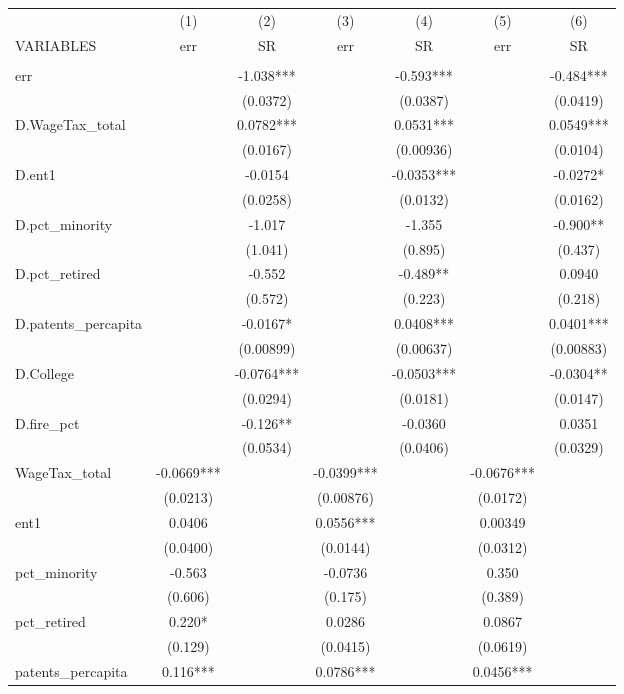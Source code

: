 \begin{tabular}{lcccccc} \hline
 & (1) & (2) & (3) & (4) & (5) & (6) \\
VARIABLES & err & SR & err & SR & err & SR \\ \hline
 &  &  &  &  &  &  \\
err &  & -1.038*** &  & -0.593*** &  & -0.484*** \\
 &  & (0.0372) &  & (0.0387) &  & (0.0419) \\
D.WageTax\_total &  & 0.0782*** &  & 0.0531*** &  & 0.0549*** \\
 &  & (0.0167) &  & (0.00936) &  & (0.0104) \\
D.ent1 &  & -0.0154 &  & -0.0353*** &  & -0.0272* \\
 &  & (0.0258) &  & (0.0132) &  & (0.0162) \\
D.pct\_minority &  & -1.017 &  & -1.355 &  & -0.900** \\
 &  & (1.041) &  & (0.895) &  & (0.437) \\
D.pct\_retired &  & -0.552 &  & -0.489** &  & 0.0940 \\
 &  & (0.572) &  & (0.223) &  & (0.218) \\
D.patents\_percapita &  & -0.0167* &  & 0.0408*** &  & 0.0401*** \\
 &  & (0.00899) &  & (0.00637) &  & (0.00883) \\
D.College &  & -0.0764*** &  & -0.0503*** &  & -0.0304** \\
 &  & (0.0294) &  & (0.0181) &  & (0.0147) \\
D.fire\_pct &  & -0.126** &  & -0.0360 &  & 0.0351 \\
 &  & (0.0534) &  & (0.0406) &  & (0.0329) \\
WageTax\_total & -0.0669*** &  & -0.0399*** &  & -0.0676*** &  \\
 & (0.0213) &  & (0.00876) &  & (0.0172) &  \\
ent1 & 0.0406 &  & 0.0556*** &  & 0.00349 &  \\
 & (0.0400) &  & (0.0144) &  & (0.0312) &  \\
pct\_minority & -0.563 &  & -0.0736 &  & 0.350 &  \\
 & (0.606) &  & (0.175) &  & (0.389) &  \\
pct\_retired & 0.220* &  & 0.0286 &  & 0.0867 &  \\
 & (0.129) &  & (0.0415) &  & (0.0619) &  \\
patents\_percapita & 0.116*** &  & 0.0786*** &  & 0.0456*** &  \\

\end{tabular}
